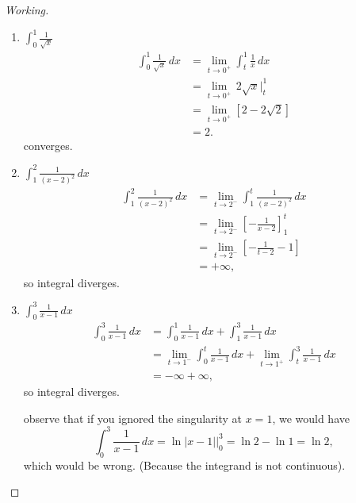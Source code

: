 \documentclass[12pt,a4paper]{report}
\theoremstyle{definition}
\theoremstyle{plain}
\begin{document}
\begin{proof}[Working]\textbf{}
\begin{enumerate}
\item[(a).] $\displaystyle{\int_0^1 \frac{1}{\sqrt{x}}}$ 
\begin{align*}
             \int_0^1 \frac{1}{\sqrt{x}}\, dx & = \lim_{t\rightarrow 0^+}\int_t^1\frac{1}{x}\, dx\\
                                              & = \lim_{t\rightarrow 0^+}\, 2\sqrt{x}\big|_t^1\\
                                              & = \lim_{t\rightarrow 0^+}\left[2 - 2\sqrt{2}\right]\\
                                              & = 2.
             \end{align*} converges.\\
             
             
\item[(b).] $\displaystyle{\int_1^2\frac{1}{(x - 2)^2}\, dx}$
\begin{align*}
\int_1^2\frac{1}{(x - 2)^2}\, dx & = \lim_{t\rightarrow 2^-}\int_1^t\frac{1}{(x-2)^2}\, dx\\
                                 & = \lim_{t\rightarrow 2^-} \left[-\frac{1}{x - 2}\right]_1^t\\
                                 & = \lim_{t\rightarrow 2^-} \left[-\frac{1}{t - 2} - 1\right]\\
                                 & = +\infty,
\end{align*} so integral diverges.


\item[(c).] $\displaystyle{\int_0^3\frac{1}{x - 1}\, dx}$
\begin{align*}
\int_0^3\frac{1}{x - 1}\, dx  & = \int_0^1\frac{1}{x - 1}\, dx + \int_1^3\frac{1}{x - 1}\, dx\\
                              & = \lim_{t\rightarrow 1^-}\int_0^t \frac{1}{x - 1}\, dx + \lim_{t\rightarrow 1^+}\int_t^3\frac{1}{x - 1}\, dx\\
                              & = -\infty + \infty,
\end{align*}
so integral diverges.


observe that if you ignored the singularity at $x = 1$, we would have 
$$\int_0^3\frac{1}{x - 1}\, dx = \ln |x - 1|\big|_0^3 = \ln 2 - \ln 1 = \ln 2,$$
which would be wrong. (Because the integrand is not continuous).
\end{enumerate}
\end{proof}
\end{document}
